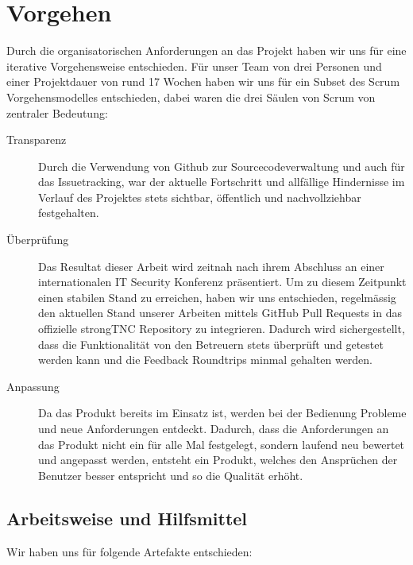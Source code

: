 \chapter{Vorgehen}

Durch die organisatorischen Anforderungen an das Projekt haben wir uns für eine
iterative Vorgehensweise entschieden. Für unser Team von drei Personen und einer
Projektdauer von rund 17 Wochen haben wir uns für ein Subset des Scrum Vorgehensmodelles
entschieden, dabei waren die drei Säulen von Scrum von zentraler Bedeutung:

\begin{description}
	\item[Transparenz] Durch die Verwendung von Github zur Sourcecodeverwaltung und
	auch für das Issuetracking, war der aktuelle Fortschritt und allfällige
	Hindernisse im Verlauf des Projektes stets sichtbar, öffentlich und
	nachvollziehbar festgehalten.

	\item[Überprüfung] Das Resultat dieser Arbeit wird zeitnah nach ihrem Abschluss
	an einer internationalen IT Security Konferenz präsentiert. Um zu diesem
	Zeitpunkt einen stabilen Stand zu erreichen, haben wir uns entschieden, regelmässig den aktuellen Stand unserer Arbeiten mittels GitHub Pull Requests
	in das offizielle strongTNC Repository zu integrieren. Dadurch wird
	sichergestellt, dass die Funktionalität von den Betreuern stets überprüft und
	getestet werden kann und die Feedback Roundtrips minmal gehalten werden.

	\item[Anpassung] Da das Produkt bereits im Einsatz ist, werden bei der
	Bedienung Probleme und neue Anforderungen entdeckt. Dadurch, dass die
	Anforderungen an das Produkt nicht ein für alle Mal festgelegt, sondern laufend
	neu bewertet und angepasst werden, entsteht ein Produkt, welches den Ansprüchen
	der Benutzer besser entspricht und so die Qualität erhöht.

\end{description}

\section{Arbeitsweise und Hilfsmittel}
Wir haben uns für folgende Artefakte\cite{alliance2008scrum} entschieden:

